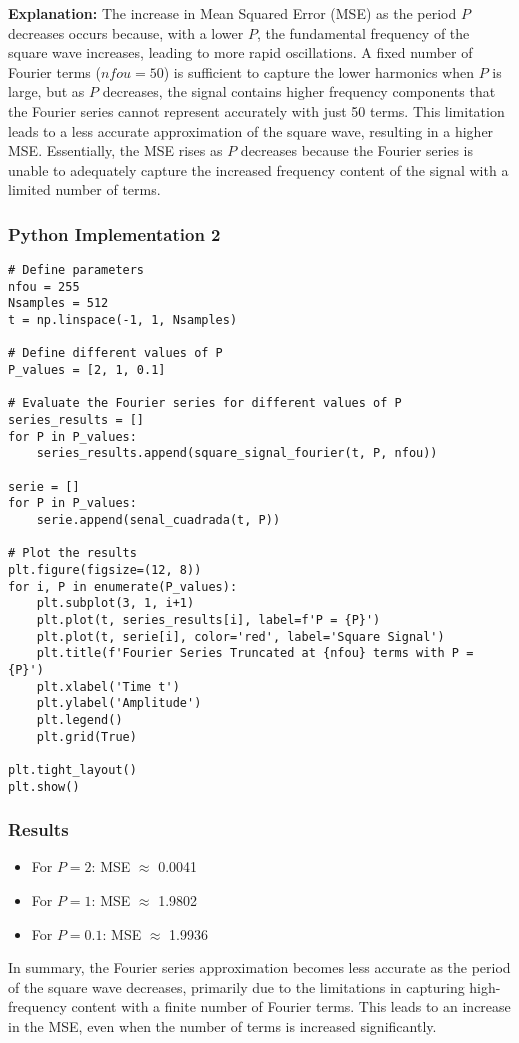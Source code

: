 \documentclass[10pt]{article}
\theoremstyle{definition}
\theoremstyle{remark}
\theoremstyle{definition}
\numberwithin{equation}{prob}
\begin{document}
\textbf{Explanation:} The increase in Mean Squared Error (MSE) as the period \( P \) decreases occurs because, with a lower \( P \), the fundamental frequency of the square wave increases, leading to more rapid oscillations. A fixed number of Fourier terms (\( nfou = 50 \)) is sufficient to capture the lower harmonics when \( P \) is large, but as \( P \) decreases, the signal contains higher frequency components that the Fourier series cannot represent accurately with just 50 terms. This limitation leads to a less accurate approximation of the square wave, resulting in a higher MSE. Essentially, the MSE rises as \( P \) decreases because the Fourier series is unable to adequately capture the increased frequency content of the signal with a limited number of terms.

\subsubsection*{Python Implementation 2}

\begin{lstlisting}
# Define parameters
nfou = 255
Nsamples = 512
t = np.linspace(-1, 1, Nsamples)

# Define different values of P
P_values = [2, 1, 0.1]

# Evaluate the Fourier series for different values of P
series_results = []
for P in P_values:
    series_results.append(square_signal_fourier(t, P, nfou))

serie = []
for P in P_values:
    serie.append(senal_cuadrada(t, P))

# Plot the results
plt.figure(figsize=(12, 8))
for i, P in enumerate(P_values):
    plt.subplot(3, 1, i+1)
    plt.plot(t, series_results[i], label=f'P = {P}')
    plt.plot(t, serie[i], color='red', label='Square Signal')
    plt.title(f'Fourier Series Truncated at {nfou} terms with P = {P}')
    plt.xlabel('Time t')
    plt.ylabel('Amplitude')
    plt.legend()
    plt.grid(True)

plt.tight_layout()
plt.show()
\end{lstlisting}

\subsubsection*{Results}

    \begin{itemize}
        \item For \( P = 2 \): MSE \( \approx \) 0.0041
        \item For \( P = 1 \): MSE \( \approx \) 1.9802
        \item For \( P = 0.1 \): MSE \( \approx \) 1.9936
    \end{itemize}

In summary, the Fourier series approximation becomes less accurate as the period of the square wave decreases, primarily due to the limitations in capturing high-frequency content with a finite number of Fourier terms. This leads to an increase in the MSE, even when the number of terms is increased significantly.
\end{document}
